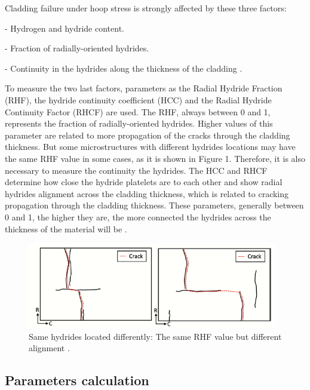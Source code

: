\documentclass[12pt]{article}
\begin{document}
\noindent
Cladding failure under hoop stress is strongly  affected by these three factors:

\vspace{0.1 mm}
- Hydrogen and hydride content.

\vspace{0.1 mm}
- Fraction of radially-oriented hydrides.

\vspace{0.1 mm}
- Continuity in the hydrides along the thickness of the cladding \cite{SIMON2021152817}.

\noindent
To measure the two last factors, parameters as the Radial Hydride Fraction (RHF), the hydride continuity coefficient (HCC) and the Radial Hydride Continuity Factor (RHCF) are used. The RHF, always between 0 and 1, represents the fraction of radially-oriented hydrides. Higher values of this parameter are related to more propagation of the cracks through the cladding thickness. But some microstructures with different hydrides locations may have the same RHF value in some cases, as it is shown in Figure 1. Therefore, it is also necessary to measure the continuity the hydrides. The HCC and RHCF determine how close the hydride platelets are to each other and show radial hydrides alignment across the cladding thickness, which is related to cracking propagation through the cladding thickness. These parameters, generally between 0 and 1, the higher they are, the more connected the hydrides across the thickness of the material will be \cite{SIMON2021152817}.

\vspace{50 mm}

\begin{figure}[h] %
    \centering
    \includegraphics[width=4.3in]{same RHF.png}
    \caption{Same hydrides located differently: The same RHF value but different alignment \cite{SIMON2021152817}.}
    \label{fig:my_label}
\end{figure}

\subsection{Parameters calculation}
\end{document}
